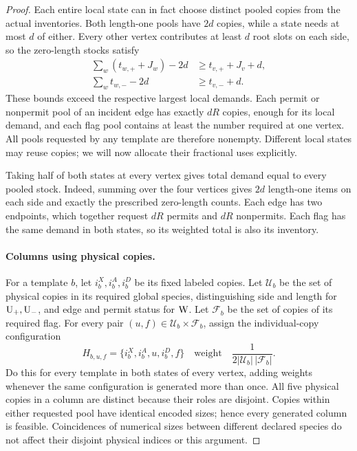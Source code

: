 \begin{proof}
Each entire local state can in fact choose distinct pooled copies
from the actual inventories.  Both length-one pools have $2d$
copies, while a state needs at most $d$ of either.
Every other vertex contributes at least $d$ root slots on each
side, so the zero-length stocks satisfy
\begin{align*}
 \sum_w(t_{w,+}+J_w)-2d&\ge t_{v,+}+J_v+d,\\
 \sum_w t_{w,-}-2d&\ge t_{v,-}+d.
\end{align*}
These bounds exceed the respective largest local demands.
Each permit or nonpermit pool of an incident edge has exactly
$dR$ copies, enough for its local demand, and each flag pool
contains at least the number required at one vertex.  All pools
requested by any template are therefore nonempty.  Different
local states may reuse copies; we will now allocate their
fractional uses explicitly.

Taking half of both states at every vertex gives total demand equal
to every pooled stock.
Indeed, summing over the four vertices gives $2d$ length-one
items on each side and exactly the prescribed zero-length counts.
Each edge has two endpoints, which together request $dR$ permits
and $dR$ nonpermits.  Each flag has the same demand in both states,
so its weighted total is also its inventory.

\paragraph{Columns using physical copies.}
For a template $b$, let $i_b^X,i_b^A,i_b^D$ be its fixed labeled
copies.  Let $\mathcal U_b$ be the set of physical copies in its
required global species, distinguishing side and length for
$\mathrm{U}_{+},\mathrm{U}_{-}$, and edge and permit status for $\mathrm{W}$.
Let $\mathcal F_b$ be the set of copies of its required flag.
For every pair $(u,f)\in\mathcal U_b\times\mathcal F_b$, assign
the individual-copy configuration
\begin{equation}\label{eq:physical-fractional-columns}
 H_{b,u,f}=\{i_b^X,i_b^A,u,i_b^D,f\}
 \quad\text{weight}\quad
 \frac{1}{2|\mathcal U_b|\,|\mathcal F_b|}.
\end{equation}
Do this for every template in both states of every vertex, adding
weights whenever the same configuration is generated more than once.
All five physical copies in a column are distinct because their
roles are disjoint.  Copies within either requested pool have
identical encoded sizes; hence every generated column is feasible.
Coincidences of numerical sizes between different declared species
do not affect their disjoint physical indices or this argument.


\end{proof}
